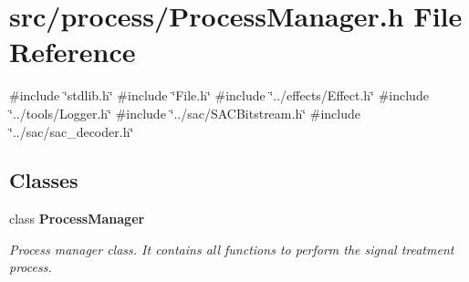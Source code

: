 \section{src/process/\+Process\+Manager.h File Reference}
\label{_process_manager_8h}
{\ttfamily \#include \char`\"{}stdlib.\+h\char`\"{}}\newline
{\ttfamily \#include \char`\"{}File.\+h\char`\"{}}\newline
{\ttfamily \#include \char`\"{}../effects/\+Effect.\+h\char`\"{}}\newline
{\ttfamily \#include \char`\"{}../tools/\+Logger.\+h\char`\"{}}\newline
{\ttfamily \#include \char`\"{}../sac/\+S\+A\+C\+Bitstream.\+h\char`\"{}}\newline
{\ttfamily \#include \char`\"{}../sac/sac\+\_\+decoder.\+h\char`\"{}}\newline
\subsection*{Classes}
\begin{DoxyCompactItemize}
\item 
class \textbf{ Process\+Manager}
\begin{DoxyCompactList}\small\item\em Process manager class. It contains all functions to perform the signal treatment process. \end{DoxyCompactList}\end{DoxyCompactItemize}
